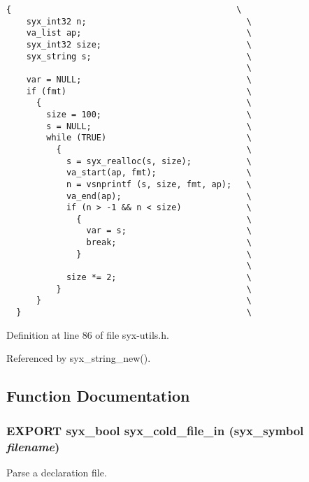 \begin{Code}\begin{verbatim}{                                             \
    syx_int32 n;                                \
    va_list ap;                                 \
    syx_int32 size;                             \
    syx_string s;                               \
                                                \
    var = NULL;                                 \
    if (fmt)                                    \
      {                                         \
        size = 100;                             \
        s = NULL;                               \
        while (TRUE)                            \
          {                                     \
            s = syx_realloc(s, size);           \
            va_start(ap, fmt);                  \
            n = vsnprintf (s, size, fmt, ap);   \
            va_end(ap);                         \
            if (n > -1 && n < size)             \
              {                                 \
                var = s;                        \
                break;                          \
              }                                 \
                                                \
            size *= 2;                          \
          }                                     \
      }                                         \
  }                                             \
\end{verbatim}
\end{Code}


Definition at line 86 of file syx-utils.h.

Referenced by syx\_\-string\_\-new().

\subsection{Function Documentation}
\hypertarget{syx-utils_8h_9c1676e48ea8f4339d62a426ad283f7a}{
\subsubsection{\setlength{\rightskip}{0pt plus 5cm}EXPORT {\bf syx\_\-bool} syx\_\-cold\_\-file\_\-in ({\bf syx\_\-symbol} {\em filename})}}
\label{syx-utils_8h_9c1676e48ea8f4339d62a426ad283f7a}


Parse a declaration file.

